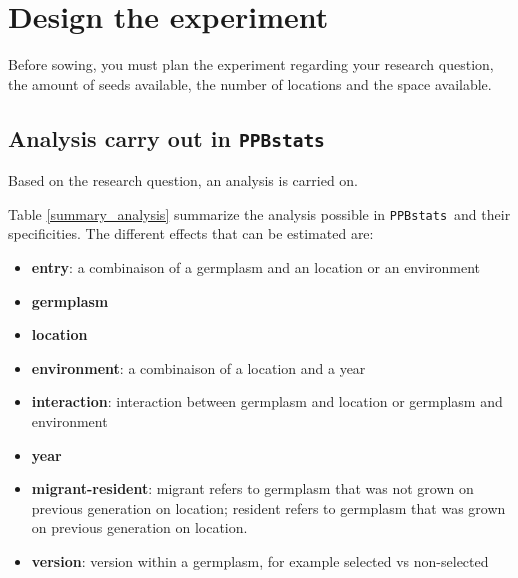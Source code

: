 \documentclass{article}\usepackage[]{graphicx}\usepackage[]{color}
\newcommand{\pack}{\texttt{PPBstats}}
\begin{document}

\newpage


\section{Design the experiment}
\label{doe}

Before sowing, you must plan the experiment regarding your research question, the amount of seeds available, the number of locations and the space available.

\subsection{Analysis carry out in \pack}

Based on the research question, an analysis is carried on.

Table \ref{summary_analysis} summarize the analysis possible in \pack~and their specificities.
The different effects that can be estimated are:
\begin{itemize}
\item \textbf{entry}: a combinaison of a germplasm and an location or an environment
\item \textbf{germplasm}
\item \textbf{location} 
\item \textbf{environment}: a combinaison of a location and a year
\item \textbf{interaction}: interaction between germplasm and location or germplasm and environment
\item \textbf{year}
\item \textbf{migrant-resident}: migrant refers to germplasm that was not grown on previous generation on location; resident refers to germplasm that was grown  on previous generation on location.
\item \textbf{version}: version within a germplasm, for example selected vs non-selected
\end{itemize}
\end{document}
